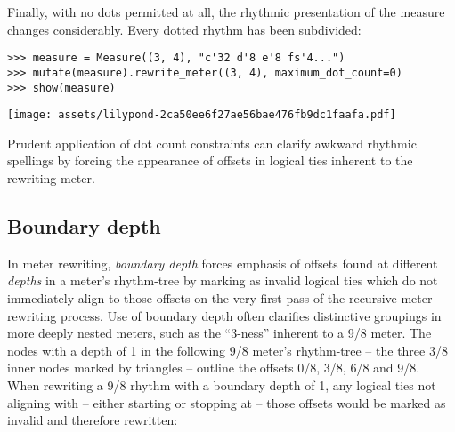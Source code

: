 \noindent Finally, with no dots permitted at all, the rhythmic presentation of
the measure changes considerably. Every dotted rhythm has been subdivided:

\begin{comment}
<abjad>
measure = Measure((3, 4), "c'32 d'8 e'8 fs'4...")
mutate(measure).rewrite_meter((3, 4), maximum_dot_count=0)
show(measure)
</abjad>
\end{comment}

\begin{abjadbookoutput}
\begin{singlespacing}
\vspace{-0.5\baselineskip}
\begin{verbatim}
>>> measure = Measure((3, 4), "c'32 d'8 e'8 fs'4...")
>>> mutate(measure).rewrite_meter((3, 4), maximum_dot_count=0)
>>> show(measure)
\end{verbatim}
\noindent\texttt{[image: assets/lilypond-2ca50ee6f27ae56bae476fb9dc1faafa.pdf]}
\end{singlespacing}
\end{abjadbookoutput}

\noindent Prudent application of dot count constraints can clarify awkward
rhythmic spellings by forcing the appearance of offsets in logical ties
inherent to the rewriting meter.

\subsection{Boundary depth} %

In meter rewriting, \emph{boundary depth} forces emphasis of offsets found at
different \emph{depths} in a meter's rhythm-tree by marking as invalid logical
ties which do not immediately align to those offsets on the very first pass of
the recursive meter rewriting process. Use of boundary depth often clarifies
distinctive groupings in more deeply nested meters, such as the
\enquote{3-ness} inherent to a 9/8 meter. The nodes with a depth of 1 in the
following 9/8 meter's rhythm-tree -- the three 3/8 inner nodes marked by
triangles -- outline the offsets 0/8, 3/8, 6/8 and 9/8. When rewriting a 9/8
rhythm with a boundary depth of 1, any logical ties not aligning with -- either
starting or stopping at -- those offsets would be marked as invalid and
therefore rewritten:

\begin{comment}
<abjad>
nine_eight_meter = metertools.Meter((9, 8))
graph(nine_eight_meter)
</abjad>
\end{comment}

